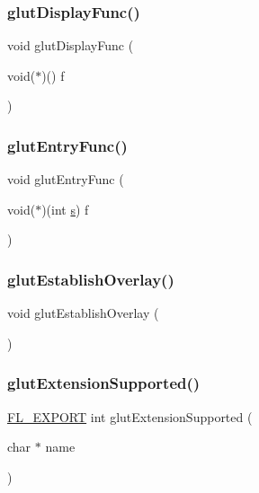 \subsubsection{\texorpdfstring{glut\+Display\+Func()}{glutDisplayFunc()}}
{\footnotesize\ttfamily void glut\+Display\+Func (\begin{DoxyParamCaption}\item[{void($\ast$)()}]{f }\end{DoxyParamCaption})\hspace{0.3cm}{\ttfamily [inline]}}

\mbox{\label{glut_8_h_a89f81d36d2d314bfa1b3159d06f445d4}} 
\subsubsection{\texorpdfstring{glut\+Entry\+Func()}{glutEntryFunc()}}
{\footnotesize\ttfamily void glut\+Entry\+Func (\begin{DoxyParamCaption}\item[{void($\ast$)(int \hyperlink{forms_8_h_a672b4f0a8c8a6db61068c721f799d87f}{s})}]{f }\end{DoxyParamCaption})\hspace{0.3cm}{\ttfamily [inline]}}

\mbox{\label{glut_8_h_a9f80c3113e264fd2e5bb8f997c66a165}} 
\subsubsection{\texorpdfstring{glut\+Establish\+Overlay()}{glutEstablishOverlay()}}
{\footnotesize\ttfamily void glut\+Establish\+Overlay (\begin{DoxyParamCaption}{ }\end{DoxyParamCaption})\hspace{0.3cm}{\ttfamily [inline]}}

\mbox{\label{glut_8_h_abbdc51c2452693f8d0640dffa15ca8b9}} 
\subsubsection{\texorpdfstring{glut\+Extension\+Supported()}{glutExtensionSupported()}}
{\footnotesize\ttfamily \hyperlink{_fl___export_8_h_aa9ba29a18aee9d738370a06eeb4470fc}{F\+L\+\_\+\+E\+X\+P\+O\+RT} int glut\+Extension\+Supported (\begin{DoxyParamCaption}\item[{char $\ast$}]{name }\end{DoxyParamCaption})}

